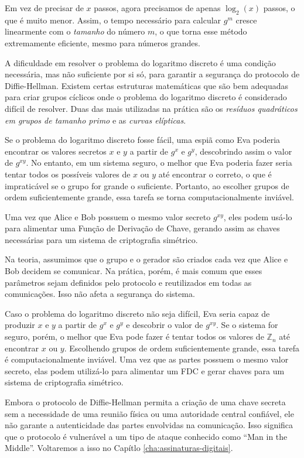 Em vez de precisar de $x$ passos, agora precisamos de apenas $\log_2(x)$ passos, o que é muito menor.
Assim, o tempo necessário para calcular $g^m$ cresce linearmente com o {\em tamanho} do número $m$, o que torna esse método extremamente eficiente, mesmo para números grandes.

A dificuldade em resolver o problema do logaritmo discreto é uma condição necessária, mas não suficiente por si só, para garantir a segurança do protocolo de Diffie-Hellman.
Existem certas estruturas matemáticas que são bem adequadas para criar grupos cíclicos onde o problema do logaritmo discreto é considerado difícil de resolver.
Duas das mais utilizadas na prática são os {\em resíduos quadráticos em grupos de tamanho primo} e as {\em curvas elípticas}.

Se o problema do logaritmo discreto fosse fácil, uma espiã como Eva poderia encontrar os valores secretos $x$ e $y$ a partir de $g^x$ e $g^y$, descobrindo assim o valor de $g^{xy}$.
No entanto, em um sistema seguro, o melhor que Eva poderia fazer seria tentar todos os possíveis valores de $x$ ou $y$ até encontrar o correto, o que é impraticável se o grupo for grande o suficiente.
Portanto, ao escolher grupos de ordem suficientemente grande, essa tarefa se torna computacionalmente inviável.

Uma vez que Alice e Bob possuem o mesmo valor secreto $g^{xy}$, eles podem usá-lo para alimentar uma Função de Derivação de Chave, gerando assim as chaves necessárias para um sistema de criptografia simétrico.

Na teoria, assumimos que o grupo e o gerador são criados cada vez que Alice e Bob decidem se comunicar.
Na prática, porém, é mais comum que esses parâmetros sejam definidos pelo protocolo e reutilizados em todas as comunicações.
Isso não afeta a segurança do sistema.

Caso o problema do logaritmo discreto não seja difícil, Eva seria capaz de produzir $x$ e $y$ a partir de $g^x$ e $g^y$ e descobrir o valor de $g^{xy}$.
Se o sistema for seguro, porém, o melhor que Eva pode fazer é tentar todos os valores de $\mathbb{Z}_n$ até encontrar $x$ ou $y$.
Escolhendo grupos de ordem suficientemente grande, essa tarefa é computacionalmente inviável.
Uma vez que as partes possuem o mesmo valor secreto, elas podem utilizá-lo para alimentar um FDC e gerar chaves para um sistema de criptografia simétrico.

Embora o protocolo de Diffie-Hellman permita a criação de uma chave secreta sem a necessidade de uma reunião física ou uma autoridade central confiável, ele não garante a autenticidade das partes envolvidas na comunicação.
Isso significa que o protocolo é vulnerável a um tipo de ataque conhecido como ``Man in the Middle''.
Voltaremos a isso no Capítlo \ref{cha:assinaturas-digitais}.

